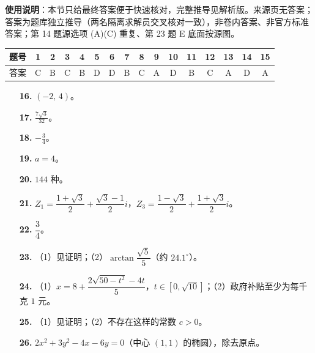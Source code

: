 
\begin{gknotice}
\textbf{使用说明}：本节只给最终答案便于快速核对，完整推导见解析版。来源页无答案；答案为题库独立推导（两名隔离求解员交叉核对一致），非卷内答案、非官方标准答案；第 14 题源选项 (A)(C) 重复、第 23 题 E 底面按源图。
\end{gknotice}

\begin{center}\begin{tabular}{cccccccccccccccc}
\toprule
题号 & 1 & 2 & 3 & 4 & 5 & 6 & 7 & 8 & 9 & 10 & 11 & 12 & 13 & 14 & 15 \\
\midrule
答案 & C & B & C & B & D & D & B & C & A & D & B & C & A & D & A \\
\bottomrule
\end{tabular}\end{center}

\begin{itemize}[leftmargin=2.6em]
  \item[\textbf{16.}] $(-2,\,4)$。
  \item[\textbf{17.}] $\frac{7\sqrt3}{32}$。
  \item[\textbf{18.}] $-\frac34$。
  \item[\textbf{19.}] $a=4$。
  \item[\textbf{20.}] $144$ 种。
\end{itemize}

\begin{itemize}[leftmargin=2.6em]
  \item[\textbf{21.}] $Z_1=\dfrac{1+\sqrt3}{2}+\dfrac{\sqrt3-1}{2}i$，$Z_3=\dfrac{1-\sqrt3}{2}+\dfrac{1+\sqrt3}{2}i$。
  \item[\textbf{22.}] $\dfrac34$。
  \item[\textbf{23.}] （1）见证明；（2）$\arctan\dfrac{\sqrt5}{5}$（约 $24.1^\circ$）。
  \item[\textbf{24.}] （1）$x=8+\dfrac{2\sqrt{50-t^2}-4t}{5}$，$t\in[0,\sqrt{10}]$；（2）政府补贴至少为每千克 $1$ 元。
  \item[\textbf{25.}] （1）见证明；（2）不存在这样的常数 $c>0$。
  \item[\textbf{26.}] $2x^2+3y^2-4x-6y=0$（中心 $(1,1)$ 的椭圆），除去原点。
\end{itemize}
